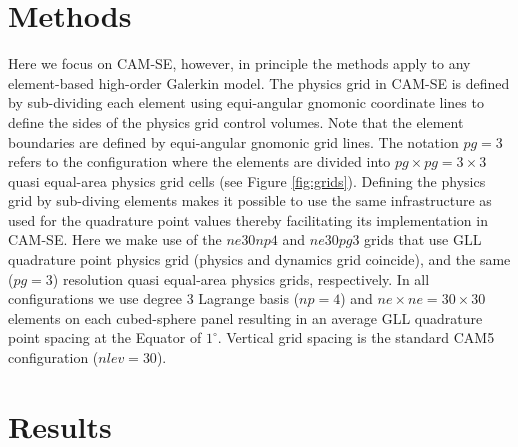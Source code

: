 \documentclass[twocol]{ametsoc}
\begin{document}
\section{Methods}
Here we focus on CAM-SE, however, in principle the methods apply to any element-based high-order Galerkin model. The physics grid in CAM-SE is defined by sub-dividing each element using equi-angular gnomonic coordinate lines to define the sides of the physics grid control volumes. Note that the element boundaries are defined by equi-angular gnomonic grid lines. The notation $pg=3$ refers to the configuration where the elements are divided into $pg\times pg=3\times 3$ quasi equal-area physics grid cells (see Figure \ref{fig:grids}). Defining the physics grid by sub-diving elements makes it possible to use the same infrastructure as used for the quadrature point values thereby facilitating its implementation in CAM-SE. Here we make use of the $ne30np4$ and $ne30pg3$ grids that use GLL quadrature point physics grid (physics and dynamics grid coincide), and the same ($pg=3$) resolution quasi equal-area physics grids, respectively. In all configurations we use degree 3 Lagrange basis ($np=4$) and $ne\times ne=30\times 30$ elements on each cubed-sphere panel resulting in an average GLL quadrature point spacing at the Equator of $1^\circ$. Vertical grid spacing is the standard CAM5 configuration ($nlev=30$).

%


\section{Results}
\end{document}

